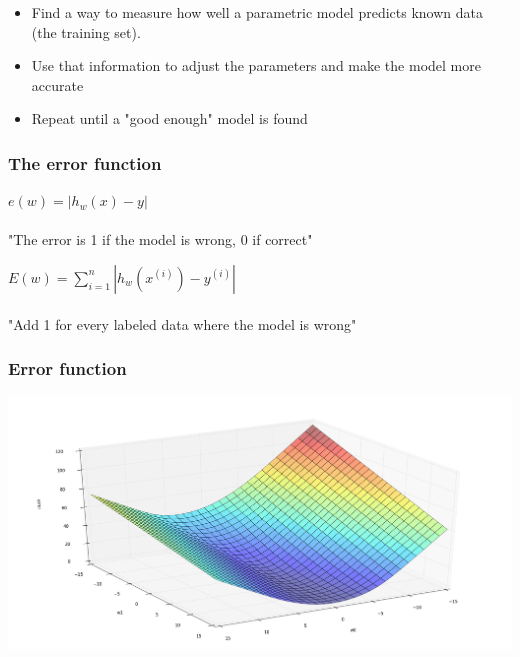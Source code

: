 \begin{frame}
  \begin{itemize}
    \item Find a way to measure how well a parametric model predicts known
      data (the training set).
    \item Use that information to adjust the
      parameters and make the model more accurate
    \item Repeat until a "good enough" model is found
  \end{itemize}
\end{frame}

\begin{frame}
  \frametitle{The error function}
  \begin{center}
    $e(w) = |h_w(x) - y|$ \\~\\
    "The error is 1 if the model is wrong, 0 if correct"
  \end{center}
\end{frame}


\begin{frame}
  \begin{center}
    $E(w) = \displaystyle\sum_{i = 1}^n{|h_w(x^{(i)}) - y^{(i)}|}$ \\~\\
    "Add 1 for every labeled data where the model is wrong"
  \end{center}
\end{frame}

\begin{frame}
  \frametitle{Error function}
  \begin{center}
    \includegraphics[scale=0.22]{./pictures/error_function.png}
  \end{center}
\end{frame}

